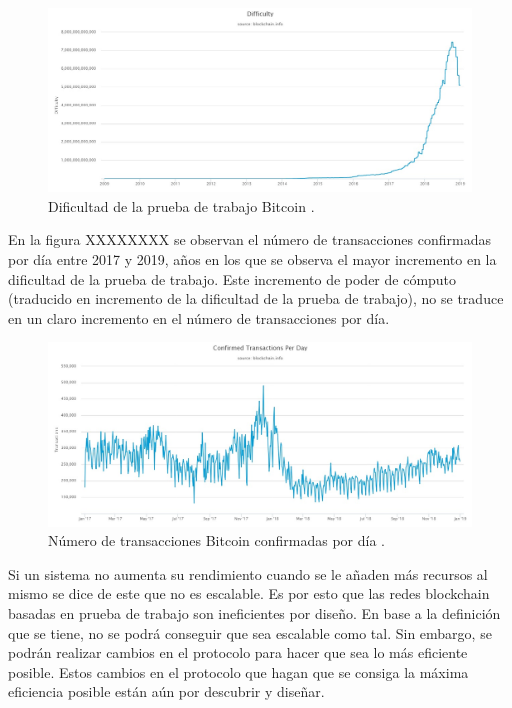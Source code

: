 \begin{figure}
	\centering
	\includegraphics[width=1\textwidth]{imagenes/difficulty.jpeg}
	\caption{\label{fig1}Dificultad de la prueba de trabajo Bitcoin \cite{blockchaininfo}.}
\end{figure}

En la figura XXXXXXXX se observan el número de transacciones confirmadas por día entre 2017 y 2019, años en los que se observa el mayor incremento en la dificultad de la prueba de trabajo. Este incremento de poder de cómputo (traducido en incremento de la dificultad de la prueba de trabajo), no se traduce en un claro incremento en el número de transacciones por día.\newline

\begin{figure}
	\centering
	\includegraphics[width=1\textwidth]{imagenes/confirmed-transactions-per-day.jpeg}
	\caption{\label{fig1}Número de transacciones Bitcoin confirmadas por día \cite{blockchaininfo}.}
\end{figure}

Si un sistema no aumenta su rendimiento cuando se le añaden más recursos al mismo se dice de este que no es escalable. Es por esto que las redes blockchain basadas en prueba de trabajo son ineficientes por diseño. En base a la definición que se tiene, no se podrá conseguir que sea escalable como tal. Sin embargo, se podrán realizar cambios en el protocolo para hacer que sea lo más eficiente posible. Estos cambios en el protocolo que hagan que se consiga la máxima eficiencia posible están aún por descubrir y diseñar. \newline

